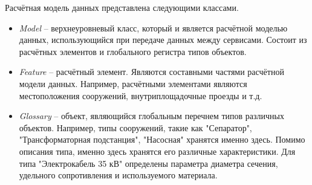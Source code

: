 Расчётная модель данных представлена следующими классами.
\begin{itemize}
	\item \textit{Model} -- верхнеуровневый класс, который и является расчётной моделью данных, использующийся
	при передаче данных между сервисами. Состоит из расчётных элементов и глобального регистра типов объектов.
	\item {
		\textit{Feature} -- расчётный элемент. Являются составными частями расчётной модели данных. Например, расчётными
		элементами являются местоположения сооружений, внутриплощадочные проезды и т.д.
	}
	\item {
		\textit{Glossary} -- объект, являющийся глобальным перечнем типов различных объектов.
		Например, типы сооружений, такие как "Сепаратор", "Трансформаторная подстанция", "Насосная" хранятся именно
		здесь. Помимо описания типа, именно здесь хранятся его различные характеристики. Для типа "Электрокабель 35 кВ"
		определены параметра диаметра сечения, удельного сопротивления и используемого материала.
	}
\end{itemize}